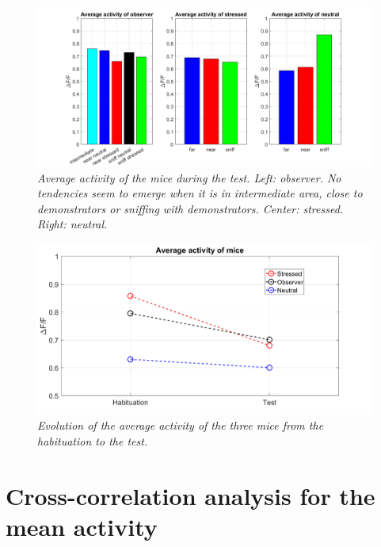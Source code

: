 \documentclass[12pt, a4paper]{report}
\begin{document}
\begin{figure}[H]
	
	\begin{center}
		\hspace*{-1.cm}
		\includegraphics[scale=.47]{activity_barplot.png} 
	\end{center} 
	\caption{\textit{Average activity of the mice during the test. Left: observer. No tendencies seem to emerge when it is in intermediate area, close to demonstrators or sniffing with demonstrators. Center: stressed.  Right: neutral.}} \label{activity_barplot}
	
\end{figure}


\begin{figure}[H]
	
	\begin{center}
		
		\includegraphics[scale=.45]{activities.png} 
	\end{center} 
	\caption{\textit{Evolution of the average activity of the three mice from the habituation to the test.}}
	\label{activities}
\end{figure}


\section{Cross-correlation analysis for the mean activity}
\end{document}
